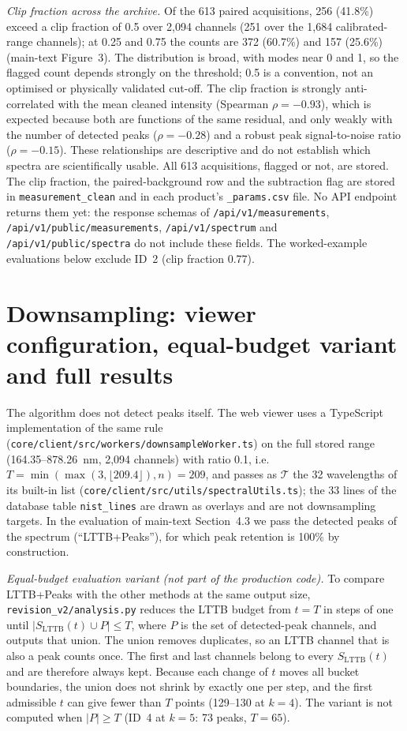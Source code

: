 \documentclass[10pt,a4paper]{article}
\begin{document}
\textit{Clip fraction across the archive.} Of the 613 paired acquisitions, 256 (41.8\%) exceed a clip fraction of 0.5 over 2,094 channels (251 over the 1,684 calibrated-range channels); at 0.25 and 0.75 the counts are 372 (60.7\%) and 157 (25.6\%) (main-text Figure~3). The distribution is broad, with modes near 0 and 1, so the flagged count depends strongly on the threshold; 0.5 is a convention, not an optimised or physically validated cut-off. The clip fraction is strongly anti-correlated with the mean cleaned intensity (Spearman $\rho=-0.93$), which is expected because both are functions of the same residual, and only weakly with the number of detected peaks ($\rho=-0.28$) and a robust peak signal-to-noise ratio ($\rho=-0.15$). These relationships are descriptive and do not establish which spectra are scientifically usable. All 613 acquisitions, flagged or not, are stored. The clip fraction, the paired-background row and the subtraction flag are stored in \texttt{measurement\_clean} and in each product's \texttt{\_params.csv} file. No API endpoint returns them yet: the response schemas of \texttt{/api/v1/measurements}, \texttt{/api/v1/public/measurements}, \texttt{/api/v1/spectrum} and \texttt{/api/v1/public/spectra} do not include these fields. The worked-example evaluations below exclude ID~2 (clip fraction 0.77).

\section{Downsampling: viewer configuration, equal-budget variant and full results}

The algorithm does not detect peaks itself. The web viewer uses a TypeScript implementation of the same rule (\texttt{core/client/src/workers/downsampleWorker.ts}) on the full stored range (164.35--878.26~nm, 2,094 channels) with ratio 0.1, i.e.\ $T=\min(\max(3,\lfloor 209.4\rfloor),n)=209$, and passes as $\mathcal{T}$ the 32 wavelengths of its built-in list (\texttt{core/client/src/utils/spectralUtils.ts}); the 33 lines of the database table \texttt{nist\_lines} are drawn as overlays and are not downsampling targets. In the evaluation of main-text Section~4.3 we pass the detected peaks of the spectrum (``LTTB+Peaks''), for which peak retention is 100\% by construction.

\textit{Equal-budget evaluation variant (not part of the production code).} To compare LTTB+Peaks with the other methods at the same output size, \texttt{revision\_v2/analysis.py} reduces the LTTB budget from $t=T$ in steps of one until $|S_{\mathrm{LTTB}}(t)\cup P|\le T$, where $P$ is the set of detected-peak channels, and outputs that union. The union removes duplicates, so an LTTB channel that is also a peak counts once. The first and last channels belong to every $S_{\mathrm{LTTB}}(t)$ and are therefore always kept. Because each change of $t$ moves all bucket boundaries, the union does not shrink by exactly one per step, and the first admissible $t$ can give fewer than $T$ points (129--130 at $k=4$). The variant is not computed when $|P|\ge T$ (ID~4 at $k=5$: 73 peaks, $T=65$).
\end{document}
